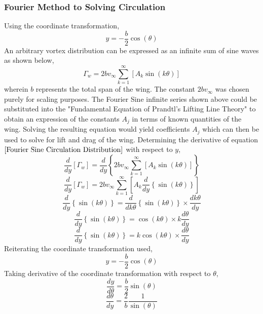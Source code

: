 \documentclass[a4paper, 12pt]{report}
\begin{document}
\begin{center}
\subsubsection{Fourier Method to Solving Circulation}
\begin{comment}
\end{comment}
Using the coordinate transformation, 
\begin{equation}
y = -\frac{b}{2}\cos(\theta)
\label{Recurring Coordinate Transformation Lifting Line}
\end{equation}
An arbitrary vortex distribution can be expressed as an infinite sum of sine waves as shown below,
\begin{equation}
\Gamma_{w} = 2bv_{\infty}\sum^{\infty}_{k = 1}\left[A_{k}\sin(k\theta)\right]
\label{Fourier Sine Circulation Distribution}
\end{equation}
wherein $b$ represents the total span of the wing. The constant $2bv_{\infty}$ was chosen purely for scaling purposes. The Fourier Sine infinite series shown above could be substituted into the "Fundamental Equation of Prandtl's Lifting Line Theory" to obtain an expression of the constants $A_{j}$ in terms of known quantities of the wing. Solving the resulting equation would yield coefficients $A_{j}$ which can then be used to solve for lift and drag of the wing. Determining the derivative of equation $\ref{Fourier Sine Circulation Distribution}$ with respect to $y$,
$$\frac{d}{d y}\left[\Gamma_{w}\right] = \frac{d}{d y}\left\{2bv_{\infty}\sum^{\infty}_{k = 1}\left[A_{k}\sin(k\theta)\right]\right\}$$
\begin{equation}
\frac{d}{d y}\left[\Gamma_{w}\right] =  2bv_{\infty}\sum^{\infty}_{k = 1}\left[A_{k}\frac{d}{d y}\left\{\sin(k\theta)\right\}\right]
\label{Fourier Sine Derivative Lifting Line}
\end{equation}
$$\frac{d}{d y}\left\{\sin(k\theta)\right\} = \frac{d}{d k\theta}\left\{\sin(k\theta)\right\}\times\frac{d k\theta}{dy}$$
$$\frac{d}{d y}\left\{\sin(k\theta)\right\} =  \cos(k\theta)  \times k\frac{d \theta}{dy}$$
$$\frac{d}{d y}\left\{\sin(k\theta)\right\} =  k\cos(k\theta) \times \frac{d \theta}{dy}$$
Reiterating the coordinate transformation used,
$$y = -\frac{b}{2}\cos(\theta)$$
Taking derivative of the coordinate transformation with respect to $\theta$,
\begin{equation}
\frac{dy}{d\theta} = \frac{b}{2}\sin(\theta)
\label{dydth Common Coordinate Transformation}
\end{equation}
$$\frac{d\theta}{dy} = \frac{2}{b}\frac{1}{\sin(\theta)}$$

\end{center}
\end{document}
